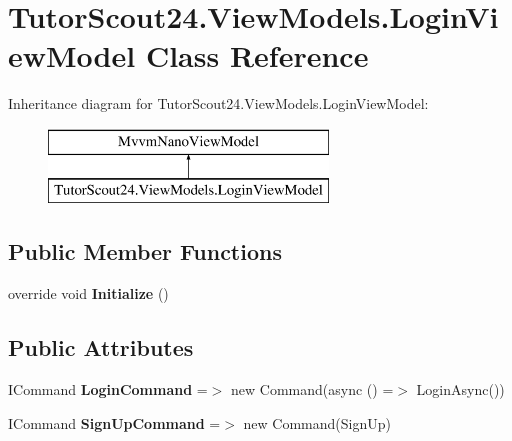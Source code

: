\hypertarget{class_tutor_scout24_1_1_view_models_1_1_login_view_model}{}\section{Tutor\+Scout24.\+View\+Models.\+Login\+View\+Model Class Reference}
\label{class_tutor_scout24_1_1_view_models_1_1_login_view_model}
Inheritance diagram for Tutor\+Scout24.\+View\+Models.\+Login\+View\+Model\+:\begin{figure}[H]
\begin{center}
\leavevmode
\includegraphics[height=2.000000cm]{class_tutor_scout24_1_1_view_models_1_1_login_view_model}
\end{center}
\end{figure}
\subsection*{Public Member Functions}
\begin{DoxyCompactItemize}
\item 
\mbox{\label{class_tutor_scout24_1_1_view_models_1_1_login_view_model_a3e84459e33d3b42a59a258ec2128040b}} 
override void {\bfseries Initialize} ()
\end{DoxyCompactItemize}
\subsection*{Public Attributes}
\begin{DoxyCompactItemize}
\item 
\mbox{\label{class_tutor_scout24_1_1_view_models_1_1_login_view_model_a8427ccc733e26910a920e4c48da58144}} 
I\+Command {\bfseries Login\+Command} =$>$ new Command(async () =$>$ Login\+Async())
\item 
\mbox{\label{class_tutor_scout24_1_1_view_models_1_1_login_view_model_af71fff1f208ee9d1a446478cbaf1a2f0}} 
I\+Command {\bfseries Sign\+Up\+Command} =$>$ new Command(Sign\+Up)
\end{DoxyCompactItemize}
